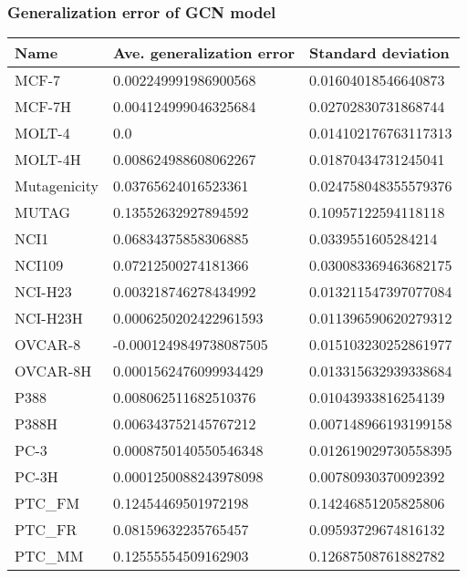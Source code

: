 \documentclass{article}
\begin{document}
\newpage

\subsubsection{Generalization error of GCN model}

\begin{table}[!ht]
    \centering
    \begin{tabular}{|l|l|l|}
    \hline
        Name & Ave. generalization error & Standard deviation \\ \hline
        MCF-7 & 0.002249991986900568 & 0.01604018546640873 \\ \hline
        MCF-7H & 0.004124999046325684 & 0.02702830731868744 \\ \hline
        MOLT-4 & 0.0 & 0.014102176763117313 \\ \hline
        MOLT-4H & 0.008624988608062267 & 0.01870434731245041 \\ \hline
        Mutagenicity & 0.03765624016523361 & 0.024758048355579376 \\ \hline
        MUTAG & 0.13552632927894592 & 0.10957122594118118 \\ \hline
        NCI1 & 0.06834375858306885 & 0.0339551605284214 \\ \hline
        NCI109 & 0.07212500274181366 & 0.030083369463682175 \\ \hline
        NCI-H23 & 0.003218746278434992 & 0.013211547397077084 \\ \hline
        NCI-H23H & 0.0006250202422961593 & 0.011396590620279312 \\ \hline
        OVCAR-8 & -0.0001249849738087505 & 0.015103230252861977 \\ \hline
        OVCAR-8H & 0.0001562476099934429 & 0.013315632939338684 \\ \hline
        P388 & 0.008062511682510376 & 0.01043933816254139 \\ \hline
        P388H & 0.006343752145767212 & 0.007148966193199158 \\ \hline
        PC-3 & 0.0008750140550546348 & 0.012619029730558395 \\ \hline
        PC-3H & 0.0001250088243978098 & 0.00780930370092392 \\ \hline
        PTC\_FM & 0.12454469501972198 & 0.14246851205825806 \\ \hline
        PTC\_FR & 0.08159632235765457 & 0.09593729674816132 \\ \hline
        PTC\_MM & 0.12555554509162903 & 0.12687508761882782 \\ \hline

\end{tabular}
\end{table}
\end{document}
